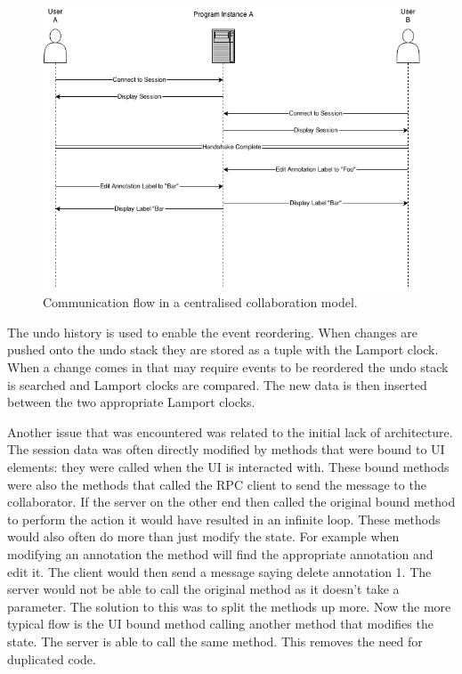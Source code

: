 \begin{figure}[h!]
    \centering
    \includegraphics[width=\textwidth]{images/collaboration_single_instance.png}
    \caption{Communication flow in a centralised collaboration model.}
    \label{fig:collab_mixup_fix_2}
\end{figure}

The undo history is used to enable the event reordering.  When changes are pushed onto the undo stack they are stored as a tuple with the Lamport clock.  When a change comes in that may require events to be reordered the undo stack is searched and Lamport clocks are compared.  The new data is then inserted between the two appropriate Lamport clocks.

Another issue that was encountered was related to the initial lack of architecture.  The session data was often directly modified by methods that were bound to \ac{UI} elements: they were called when the \ac{UI} is interacted with.  These bound methods were also the methods that called the \ac{RPC} client to send the message to the collaborator. If the server on the other end then called the original bound method to perform the action it would have resulted in an infinite loop.  These methods would also often do more than just modify the state. For example when modifying an annotation the method will find the appropriate annotation and edit it.  The client would then send a message saying delete annotation 1.  The server would not be able to call the original method as it doesn't take a parameter.  The solution to this was to split the methods up more.  Now the more typical flow is the \ac{UI} bound method calling another method that modifies the state.  The server is able to call the same method.  This removes the need for duplicated code.

